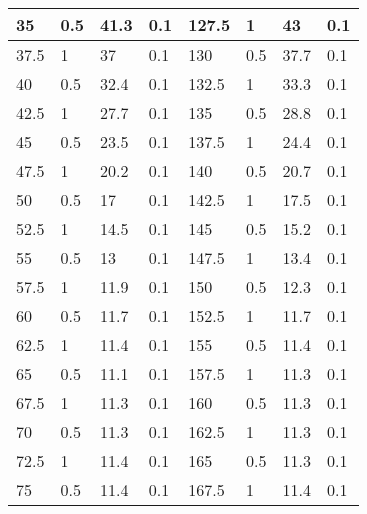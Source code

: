 \begin{table}[]
\begin{tabular}{|l|l|l|l||l|l|l|l|}
35    & 0.5         & 41.3            & 0.1         & 127.5 & 1           & 43              & 0.1         \\ \hline
37.5  & 1           & 37              & 0.1         & 130   & 0.5         & 37.7            & 0.1         \\ \hline
40    & 0.5         & 32.4            & 0.1         & 132.5 & 1           & 33.3            & 0.1         \\ \hline
42.5  & 1           & 27.7            & 0.1         & 135   & 0.5         & 28.8            & 0.1         \\ \hline
45    & 0.5         & 23.5            & 0.1         & 137.5 & 1           & 24.4            & 0.1         \\ \hline
47.5  & 1           & 20.2            & 0.1         & 140   & 0.5         & 20.7            & 0.1         \\ \hline
50    & 0.5         & 17              & 0.1         & 142.5 & 1           & 17.5            & 0.1         \\ \hline
52.5  & 1           & 14.5            & 0.1         & 145   & 0.5         & 15.2            & 0.1         \\ \hline
55    & 0.5         & 13              & 0.1         & 147.5 & 1           & 13.4            & 0.1         \\ \hline
57.5  & 1           & 11.9            & 0.1         & 150   & 0.5         & 12.3            & 0.1         \\ \hline
60    & 0.5         & 11.7            & 0.1         & 152.5 & 1           & 11.7            & 0.1         \\ \hline
62.5  & 1           & 11.4            & 0.1         & 155   & 0.5         & 11.4            & 0.1         \\ \hline
65    & 0.5         & 11.1            & 0.1         & 157.5 & 1           & 11.3            & 0.1         \\ \hline
67.5  & 1           & 11.3            & 0.1         & 160   & 0.5         & 11.3            & 0.1         \\ \hline
70    & 0.5         & 11.3            & 0.1         & 162.5 & 1           & 11.3            & 0.1         \\ \hline
72.5  & 1           & 11.4            & 0.1         & 165   & 0.5         & 11.3            & 0.1         \\ \hline
75    & 0.5         & 11.4            & 0.1         & 167.5 & 1           & 11.4            & 0.1         \\ \hline

\end{tabular}
\end{table}
